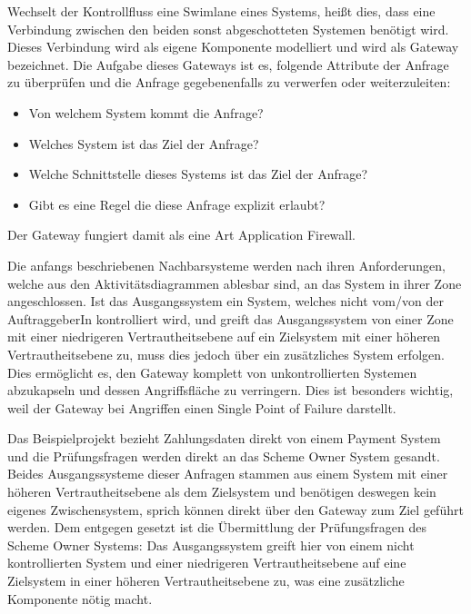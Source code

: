 Wechselt der Kontrollfluss eine Swimlane eines Systems, heißt dies, dass eine Verbindung zwischen den beiden sonst abgeschotteten Systemen benötigt wird. Dieses Verbindung wird als eigene Komponente modelliert und wird als Gateway bezeichnet. Die Aufgabe dieses Gateways ist es, folgende Attribute der Anfrage zu überprüfen und die Anfrage gegebenenfalls zu verwerfen oder weiterzuleiten:

\begin{itemize}
  \item Von welchem System kommt die Anfrage?
  \item Welches System ist das Ziel der Anfrage?
  \item Welche Schnittstelle dieses Systems ist das Ziel der Anfrage?
  \item Gibt es eine Regel die diese Anfrage explizit erlaubt?
\end{itemize}

Der Gateway fungiert damit als eine Art Application Firewall.

Die anfangs beschriebenen Nachbarsysteme werden nach ihren Anforderungen, welche aus den Aktivitätsdiagrammen ablesbar sind, an das System in ihrer Zone angeschlossen. Ist das Ausgangssystem ein System, welches nicht vom/von der AuftraggeberIn kontrolliert wird, und greift das Ausgangssystem von einer Zone mit einer niedrigeren Vertrautheitsebene auf ein Zielsystem mit einer höheren Vertrautheitsebene zu, muss dies jedoch über ein zusätzliches System erfolgen. Dies ermöglicht es, den Gateway komplett von unkontrollierten Systemen abzukapseln und dessen Angriffsfläche zu verringern. Dies ist besonders wichtig, weil der Gateway bei Angriffen einen Single Point of Failure darstellt.

Das Beispielprojekt bezieht Zahlungsdaten direkt von einem Payment System und die Prüfungsfragen werden direkt an das Scheme Owner System gesandt. Beides Ausgangssysteme dieser Anfragen stammen aus einem System mit einer höheren Vertrautheitsebene als dem Zielsystem und benötigen deswegen kein eigenes Zwischensystem, sprich können direkt über den Gateway zum Ziel geführt werden. Dem entgegen gesetzt ist die Übermittlung der Prüfungsfragen des Scheme Owner Systems: Das Ausgangssystem greift hier von einem nicht kontrollierten System und einer niedrigeren Vertrautheitsebene auf eine Zielsystem in einer höheren Vertrautheitsebene zu, was eine zusätzliche Komponente nötig macht.

